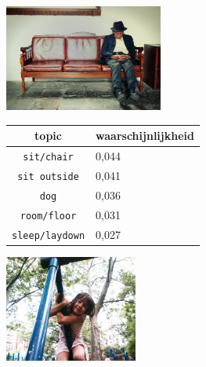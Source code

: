 \begin{figure}
\begin{subfigure}{\textwidth}
    \centering
    \begin{minipage}[t][3.5cm]{.5\linewidth}
    \centering
    \vspace{0pt}
    \includegraphics[height=3.5cm]{Images/LDA/4862204000.jpg}
    \end{minipage}\hfill
    \begin{minipage}[t]{.5\textwidth}
    \centering
    \vspace{0pt}
    \begin{tabular}{cl}
            topic                           & waarschijnlijkheid\\
            \hline
            \texttt{sit/chair}             & 0,044 \\
            \texttt{sit outside}                   & 0,041 \\
            \texttt{dog}                 & 0,036 \\
            \texttt{room/floor}           & 0,031 \\
            \texttt{sleep/laydown}        & 0,027\\
            \hline
        \end{tabular}
    \end{minipage}
\end{subfigure}
\vspace*{4mm}
\begin{subfigure}{\textwidth}
    \centering
    \begin{minipage}[t][3.5cm]{.5\linewidth}
    \centering
    \vspace{0pt}
    \includegraphics[height=3.5cm]{Images/LDA/3643021980.jpg}
    \end{minipage}\hfill

\end{subfigure}
\end{figure}
